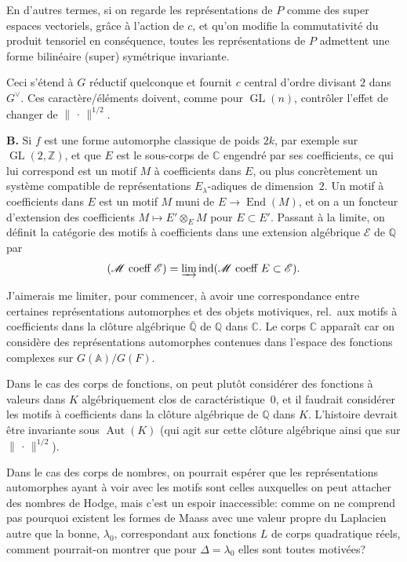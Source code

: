 \documentclass[11pt,a4paper]{article}
\theoremstyle{plain}
\theoremstyle{definition}
\DeclareMathOperator{\Aut}{Aut}
\DeclareMathOperator{\End}{End}
\DeclareMathOperator{\ind}{ind}
\DeclareMathOperator{\GL}{GL}
\newcommand{\norm}[1]{\lVert#1\rVert}
\begin{document}
En d'autres termes, si on regarde les repr\'{e}sentations de $P$ comme des super espaces vectoriels, gr\^{a}ce \`{a} l'action de $c$, et qu'on modifie la commutativit\'{e} du produit tensoriel en cons\'{e}quence, toutes les repr\'{e}sentations de $P$ admettent une forme bilin\'{e}aire (super) sym\'{e}trique invariante.

Ceci s'\'{e}tend \`{a} $G$ r\'{e}ductif quelconque et fournit $c$ central d'ordre divisant $2$ dans $G^\vee$. Ces caract\`{e}re/\'{e}l\'{e}ments doivent, comme pour $\GL(n)$, contr\^{o}ler l'effet de changer de $\norm{\,\cdot\,}^{1/2}$.

\bigskip
\noindent \textbf{B.} Si $f$ est une forme automorphe classique de poids $2k$, par exemple sur $\GL(2,\mathbb Z)$, et que $E$ est le sous-corps de $\mathbb C$ engendr\'{e} par ses coefficients, ce qui lui correspond est un motif $M$ \`{a} coefficients dans $E$, ou plus concr\`{e}tement un syst\`{e}me compatible de repr\'{e}sentations $E_\lambda$-adiques de dimension~$2$. Un motif \`{a} coefficients dans $E$ est un motif $M$ muni de $E \to \End(M)$, et on a un foncteur d'extension des coefficients $M \mapsto E' \otimes_E M$ pour $E \subset E'$. Passant \`{a} la limite, on d\'{e}finit la cat\'{e}gorie des motifs \`{a} coefficients dans une extension alg\'{e}brique $\mathcal E$ de $\mathbb Q$ par
\[
(\mathcal M \text{ coeff } \mathcal E) = \varinjlim \ind(\mathcal M \text{ coeff } E \subset \mathcal E).
\]

J'aimerais me limiter, pour commencer, \`{a} avoir une correspondance entre certaines repr\'{e}sentations automorphes et des objets motiviques, rel.~aux motifs \`{a} coefficients dans la cl\^{o}ture alg\'{e}brique $\bar{\mathbb Q}$ de $\mathbb Q$ dans $\mathbb C$. Le corps $\mathbb C$ appara\^{i}t car on consid\`{e}re des repr\'{e}sentations automorphes contenues dans l'espace des fonctions complexes sur $G(\mathbb A)/G(F)$.

Dans le cas des corps de fonctions, on peut plut\^{o}t consid\'{e}rer des fonctions \`{a} valeurs dans $K$ alg\'{e}briquement clos de caract\'{e}ristique~$0$, et il faudrait consid\'{e}rer les motifs \`{a} coefficients dans la cl\^{o}ture alg\'{e}brique de $\mathbb Q$ dans $K$. L'histoire devrait \^{e}tre invariante sous $\Aut(K)$ (qui agit sur cette cl\^{o}ture alg\'{e}brique ainsi que sur $\norm{\,\cdot\,}^{1/2}$).

Dans le cas des corps de nombres, on pourrait esp\'{e}rer que les repr\'{e}sentations automorphes ayant \`{a} voir avec les motifs sont celles auxquelles on peut attacher des nombres de Hodge, mais c'est un espoir inaccessible: comme on ne comprend pas pourquoi existent les formes de Maass avec une valeur propre du Laplacien autre que la bonne, $\lambda_0$, correspondant aux fonctions $L$ de corps quadratique r\'{e}els, comment pourrait-on montrer que pour $\Delta = \lambda_0$ elles sont toutes motiv\'{e}es?
\end{document}
